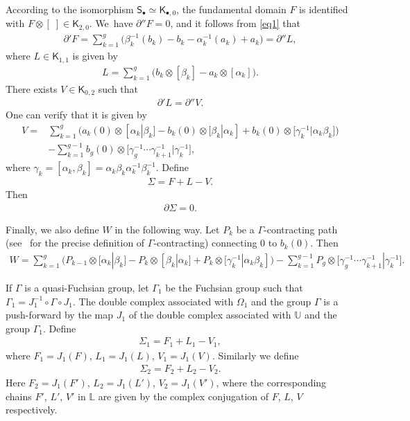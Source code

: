 \documentclass[pdftex]{sigma}%
\numberwithin{equation}{section}
\newcommand{\pa}{\partial}
\begin{document}
According to the isomorphism
$\mathsf{S}_{\bullet}\simeq\mathsf{K}_{\bullet,0}$, the fundamental domain $F$ is
identified with $F \otimes [\;] \allowbreak\in \mathsf{K}_{2,0}$. We~have $\pa'' F
= 0$, and it follows from \eqref{eq1} that
\begin{gather*}
\pa' F = \sum_{k=1}^g \big(\beta_k^{-1}(b_k) - b_k -\alpha_k^{-1}(a_k) +a_k\big) =\partial'' L,
\end{gather*}
where $L\in \mathsf{K}_{1,1}$ is given by
\begin{gather*} %
L= \sum_{k=1}^g \big(b_k\otimes[\beta_k] -a_k\otimes[\alpha_k]\big).
\end{gather*}
There exists $V\in\mathsf{K}_{0,2}$ such that
\begin{gather*}%
 \pa ' L=\pa'' V.
\end{gather*}
 One can verify that it is given by
\begin{align*} %
V= {}&\sum_{k=1}^g \big(a_k(0)\otimes[ \alpha_k| \beta_k] - b_k(0)\otimes[\beta_k|\alpha_k] +
b_k(0)\otimes\big[\gamma_k^{-1}|\alpha_k\beta_k\big]\big)
\\
& -\sum_{k=1}^{g-1}
b_g(0)\otimes\big[\gamma_g^{-1}\cdots\gamma_{k+1}^{-1}|\gamma_k^{-1}\big],
\end{align*}
where $\gamma_k=[\alpha_k, \beta_k]=\alpha_k\beta_k\alpha_k^{-1}\beta_k^{-1}$.
Define
\begin{gather*}
\Sigma = F + L - V.
\end{gather*}
Then
\begin{gather*}
\pa \Sigma = 0.
\end{gather*}

Finally, we also define $W$ in the following way. Let $P_k$ be a $\Gamma$-contracting path (see~\cite[Definition~2.3]{2} for the precise definition of $\Gamma$-contracting) connecting 0 to $b_k(0)$. Then
\begin{gather*} %
W = \sum_{k=1}^g\! \big(P_{k-1}\otimes[\alpha_k|\beta_k] -
P_k\otimes[\beta_k|\alpha_k] +P_k\otimes[\gamma_k^{-1}|\alpha_k\beta_k]\big)
-\sum_{k=1}^{g-1}\!
P_g\otimes\big[\gamma_g^{-1}\cdots\gamma_{k+1}^{-1}| \gamma_k^{-1}\big].
\end{gather*}

If $\Gamma$ is a quasi-Fuchsian group, let $\Gamma_1$ be the Fuchsian group such that $\Gamma_1=J_1^{-1}\circ \Gamma\circ J_1$. The double complex associated with $\Omega_1$ and the group $\Gamma$ is a push-forward by the map $J_1$ of the double complex associated with $\mathbb{U}$ and the group $\Gamma_1$. Define
\begin{gather*}
\Sigma_1 =F_1 +L_1 -V_1,
\end{gather*}
where $F_1=J_1(F)$, $L_1=J_1(L)$, $V_1=J_1(V)$. Similarly we define
\begin{gather*}
\Sigma_2 =F_2 +L_2 -V_2.
\end{gather*}
Here $F_2=J_1(F')$, $L_2=J_1(L')$, $V_2=J_1(V')$, where the corresponding chains $F'$, $L'$, $V'$ in $\mathbb{L}$ are given by the complex conjugation of $F$, $L$, $V$ respectively.
\end{document}
